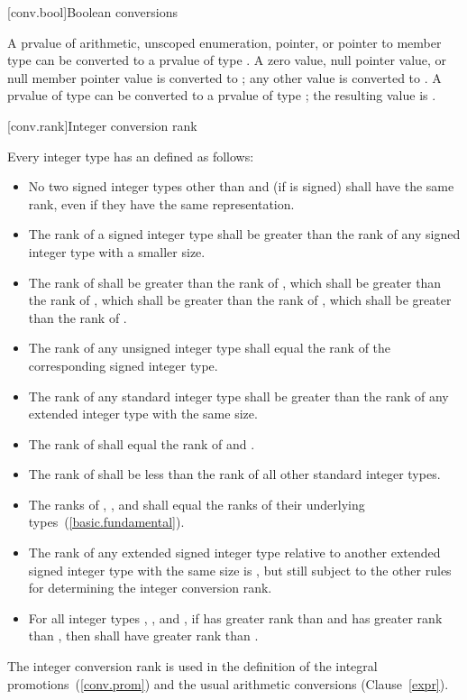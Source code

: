 [conv.bool]{Boolean conversions}

\pnum
{}%
A prvalue of arithmetic, unscoped enumeration, pointer, or pointer to member
type can be converted to a prvalue of type . A zero value, null
pointer value, or null member pointer value is converted to ; any
other value is converted to . A prvalue of type
 can be converted to a prvalue of type
; the resulting value is .

[conv.rank]{Integer conversion rank}%

\pnum
Every integer type has an  defined as follows:

\begin{itemize}
\item No two signed integer types other than  and  (if  is signed) shall have the same rank, even if they have
the same representation.

\item The rank of a signed integer type shall be greater than the rank
of any signed integer type with a smaller size.

\item The rank of    shall be greater
than the rank of  , which shall be greater than
the rank of , which shall be greater than the rank of
 , which shall be greater than the rank of
 .

\item The rank of any unsigned integer type shall equal the rank of the
corresponding signed integer type.

\item The rank of any standard integer type shall be greater than the
rank of any extended integer type with the same size.

\item The rank of  shall equal the rank of 
 and  .

\item The rank of  shall be less than the rank of all other
standard integer types.

\item The ranks of , , and
 shall equal the ranks of their underlying
types~(\ref{basic.fundamental}).

\item The rank of any extended signed integer type relative to another
extended signed integer type with the same size is , but still subject to the other rules for determining the integer
conversion rank.

\item For all integer types , , and , if
 has greater rank than  and  has greater
rank than , then  shall have greater rank than
.
\end{itemize}

\enternote
The integer conversion rank is used in the definition of the integral
promotions~(\ref{conv.prom}) and the usual arithmetic
conversions (Clause~\ref{expr}).
\exitnote%
